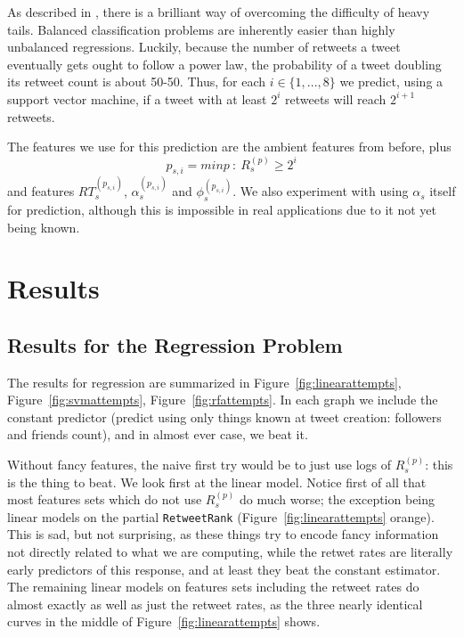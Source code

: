 As described in \cite{DBLP:journals/corr/ChengADKL14}, there is a brilliant way of overcoming the difficulty of heavy tails.
Balanced classification problems are inherently easier than highly unbalanced regressions.
Luckily, because the number of retweets a tweet eventually gets ought to follow a power law, the probability of a tweet doubling its retweet count is about 50-50.  
Thus, for each $i\in\{1,...,8\}$ we predict, using a support vector machine, if a tweet with at least $2^i$ retweets will reach $2^{i+1}$ retweets.

The features we use for this prediction are the ambient features from before, plus
\[p_{s,i}=min p~:~R_s^{(p)}\ge 2^i\]
and features $RT^{(p_{s,i})}_s$, $\alpha^{(p_{s,i})}_s$ and $\phi^{(p_{s,i})}_s$.
We also experiment with using $\alpha_s$ itself for prediction, although this is impossible in real applications due to it not yet being known.  


\section{Results}

\subsection{Results for the Regression Problem}

The results for regression are summarized in Figure~\ref{fig:linearattempts}, Figure~\ref{fig:svmattempts}, Figure~\ref{fig:rfattempts}.  
In each graph we include the constant predictor (predict using only things known at tweet creation: followers and friends count), and in almost ever case, we beat it.

Without fancy features, the naive first try would be to just use logs of $R_s^{(p)}$: this is the thing to beat.
We look first at the linear model.  
Notice first of all that most features sets which do not use $R_s^{(p)}$ do much worse; the exception being linear models on the partial \texttt{RetweetRank} (Figure~\ref{fig:linearattempts} orange).  
This is sad, but not surprising, as these things try to encode fancy information not directly related to what we are computing, while the retwet rates are literally early predictors of this response, and at least they beat the constant estimator.  
The remaining linear models on features sets including the retweet rates do almost exactly as well as just the retweet rates, as the three nearly identical curves in the middle of Figure~\ref{fig:linearattempts} shows.  


